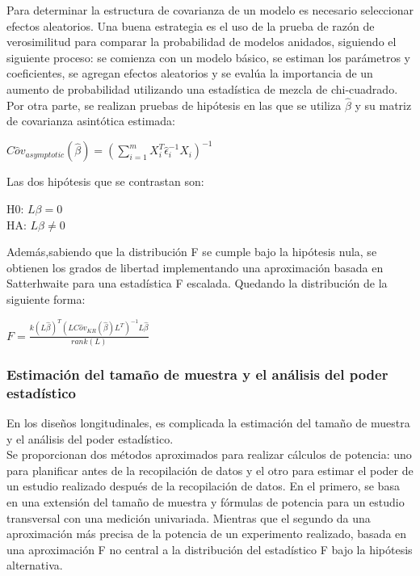 	Para determinar la estructura de covarianza de un modelo es necesario seleccionar efectos aleatorios. Una buena estrategia es el uso de la prueba de razón de verosimilitud para comparar la probabilidad de modelos anidados, siguiendo el siguiente proceso: se comienza con un modelo básico, se estiman los parámetros y coeficientes, se agregan efectos aleatorios y se evalúa la importancia de un aumento de probabilidad utilizando una estadística de mezcla de chi-cuadrado.\\
	
	Por otra parte, se realizan pruebas de hipótesis en las que se utiliza $\hat{\beta}$ y su matriz de covarianza asintótica estimada:
	\begin{center}
		$C \hat{o} v_{asymptotic}(\hat{\beta})=(\sum_{i=1}^{m}X_{i}^{T} \hat{\epsilon}_{i}^{-1}X_{i})^{-1}$
	\end{center}
	
	Las dos hipótesis que se contrastan son:
	\begin{center}
		H0: $L \beta = 0$\\HA: $L \beta \neq 0$
	\end{center}
	Además,sabiendo que la distribución F se cumple bajo la hipótesis nula, se obtienen los grados de libertad implementando una aproximación basada en Satterhwaite para una estadística F escalada. Quedando la distribución de la siguiente forma:
	\begin{center}
		$F=\frac{\mathit{k}(L\hat{\beta})^{T}(LC\hat{o}v_{KR}(\hat{\beta})L^{T})^{-1}L\hat{\beta}}{rank(L)}$
	\end{center}
	
	
	
	\subsubsection{Estimación del tamaño de muestra y el análisis del poder estadístico}
	
	En los diseños longitudinales, es complicada la estimación del tamaño de muestra y el análisis del poder estadístico. \\
	
	Se proporcionan dos métodos aproximados para realizar cálculos de potencia: uno para planificar antes de la recopilación de datos y el otro para estimar el poder de un estudio realizado después de la recopilación de datos. En el primero, se basa en una extensión del tamaño de muestra y fórmulas de potencia para un estudio transversal con una medición univariada. Mientras que el segundo da una aproximación más precisa de la potencia de un experimento realizado, basada en una aproximación F no central a la distribución del estadístico F bajo la hipótesis alternativa. 
	
